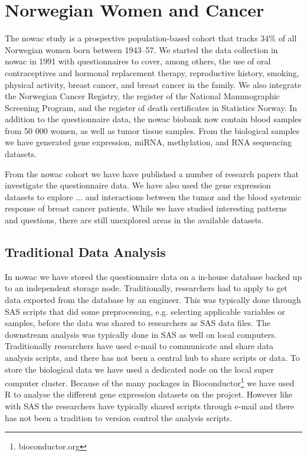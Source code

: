 \section{Norwegian Women and Cancer} 
The \gls{nowac} study is a prospective population-based cohort that tracks 34\%
of all Norwegian women born between 1943–57.\cite{lund2007cohort} We started the
data collection in \gls{nowac} in 1991 with questionnaires to cover, among
others, the use of oral contraceptives and hormonal replacement therapy,
reproductive history, smoking, physical activity, breast cancer, and breast
cancer in the family.  We also integrate the Norwegian Cancer Registry, the
register of the National Mammographic Screening Program, and the register of
death certificates in Statistics Norway.  In addition to the questionnaire data,
the \gls{nowac} biobank now contain blood samples from 50 000 women, as well as
tumor tissue samples. From the biological samples we have generated gene
expression, miRNA, methylation, and RNA sequencing datasets. 

From the \gls{nowac} cohort we have have published a number of research papers
that investigate the questionnaire data\cite{find-some-papers}. We have also
used the gene expression datasets to explore ... and interactions between the
tumor and the blood systemic response of breast cancer
patients.\cite{dumeaux2017interactions} While we have studied interesting
patterns and questions, there are still unexplored areas in the available
datasets.

\subsection*{Traditional Data Analysis} 
In \gls{nowac} we have stored the questionnaire data on a in-house database
backed up to an independent storage node. Traditionally, researchers had to
apply to get data exported from the database by an engineer. This was typically
done through SAS scripts that did some preprocessing, e.g. selecting
applicable variables or samples, before the data was shared
to researchers as SAS data files. The downstream analysis was typically done in
SAS as well on local computers. Traditionally researchers have used e-mail to
communicate and share data analysis scripts, and there has not been a central
hub to share scripts or data. To store the biological data we have used a
dedicated node on the local super computer cluster. Because of the many packages
in Bioconductor\footnote{bioconductor.org} we have used R to analyse the
different gene expression datasets on the projcet. However like with SAS the
researchers have typically shared scripts through e-mail and there has not been
a tradition to version control the analysis scripts. 

